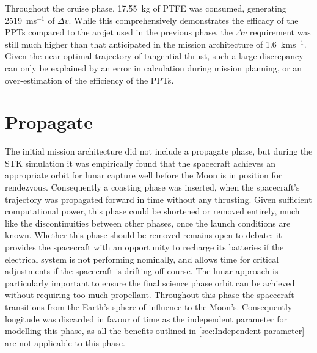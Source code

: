 Throughout the cruise phase, 17.55~kg of PTFE was consumed, generating 2519~ms$^{-1}$ of $\Delta v$. While this comprehensively demonstrates the efficacy of the PPTs compared to the arcjet used in the previous phase, the $\Delta v$ requirement was still much higher than that anticipated in the mission architecture of 1.6~kms$^{-1}$. Given the near-optimal trajectory of tangential thrust, such a large discrepancy can only be explained by an error in calculation during mission planning, or an over-estimation of the efficiency of the PPTs.



\clearpage 


\section{Propagate} \label{sec:Propagate}

The initial mission architecture did not include a propagate phase, but during the STK simulation it was empirically found that the spacecraft achieves an appropriate orbit for lunar capture well before the Moon is in position for rendezvous. Consequently a coasting phase was inserted, when the spacecraft's trajectory was propagated forward in time without any thrusting. Given sufficient computational power, this phase could be shortened or removed entirely, much like the discontinuities between other phases, once the launch conditions are known. Whether this phase should be removed remains open to debate: it provides the spacecraft with an opportunity to recharge its batteries if the electrical system is not performing nominally, and allows time for critical adjustments if the spacecraft is drifting off course. The lunar approach is particularly important to ensure the final science phase orbit can be achieved without requiring too much propellant. Throughout this phase the spacecraft transitions from the Earth's sphere of influence to the Moon's. Consequently longitude was discarded in favour of time as the independent parameter for modelling this phase, as all the benefits outlined in \autoref{sec:Independent-parameter} are not applicable to this phase.

